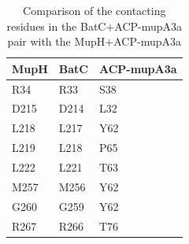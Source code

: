 	\begin{table}[htbp]
	\caption{Comparison of the contacting residues in the BatC+ACP-mupA3a pair with the MupH+ACP-mupA3a}
	\begin{center}
	\begin{tabular}{lll}
		\toprule[2pt]
		\multicolumn{1}{l}{\textbf{MupH}} & \multicolumn{1}{l}{\textbf{BatC}} & \multicolumn{1}{l}{\textbf{ACP-mupA3a}} \\ \midrule[1pt]
		R34                                & R33                                & S38                                \\
		D215                               & D214                               & L32                                 \\
		L218                               & L217                               & Y62                                 \\
		L219                               & L218                               & P65                                 \\
		L222                               & L221                               & T63                                 \\
		M257                               & M256                               & Y62                                 \\
		G260                               & G259                               & Y62                                 \\
		R267                               & R266                               & T76                                 \\ \bottomrule[2pt]
	\end{tabular}
	\end{center}
	\label{tab:batcCONTAC}
	\end{table}

